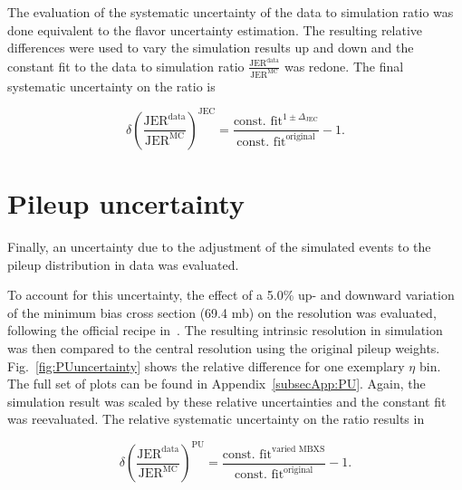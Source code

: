 The evaluation of the systematic uncertainty of the data to simulation ratio was done equivalent to the flavor uncertainty estimation. 
The resulting relative differences were used to vary the simulation results up and down and the constant fit to the data to simulation ratio
$\frac{\text{JER}^{\text{data}}}{\text{JER}^{\text{MC}}}$ was redone. The final systematic uncertainty on the ratio is 

\begin{equation}
\label{JECUncFINAL}
\delta \left( \frac{\text{JER}^{\text{data}}}{\text{JER}^{\text{MC}}} \right)^{\text{JEC}} = \frac{\text{const. fit}^{1 \pm \Delta_{\text{JEC}}}}{\text{const. fit}^{\text{original}}} - 1.
\end{equation}

\section*{Pileup uncertainty}
Finally, an uncertainty due to the adjustment of the simulated events to the pileup distribution in data was evaluated.

To account for this uncertainty, the effect of a 5.0\% up- and downward variation of the minimum bias cross section (69.4 mb) 
on the resolution was evaluated, following the official recipe \mbox{in \cite{website:PileupSystematicErrors}}.
The resulting intrinsic resolution in simulation was then compared to the central resolution using the original pileup weights.
\mbox{Fig. \ref{fig:PUuncertainty}} shows the relative difference for one exemplary $\eta$ bin. 
The full set of plots can be found in \mbox{Appendix \ref{subsecApp:PU}}. 
Again, the simulation result was scaled by these relative uncertainties and the constant fit was reevaluated.
The relative systematic uncertainty on the ratio results in

\begin{equation}
\label{PUUncFINAL}
\delta \left( \frac{\text{JER}^{\text{data}}}{\text{JER}^{\text{MC}}} \right)^{\text{PU}} = \frac{\text{const. fit}^{\text{varied MBXS}}}{\text{const. fit}^{\text{original}}} - 1.
\end{equation}

